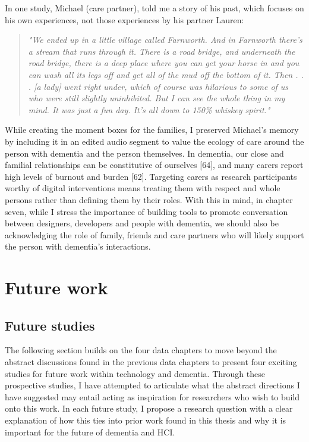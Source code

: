 In one study, Michael (care partner), told me a story of his past, which focuses on his own experiences, not those experiences by his partner Lauren:
\begin{quote}
\textit{"We ended up in a little village called Farnworth. And in Farnworth there's a stream that runs through it. There is a road bridge, and underneath the road bridge, there is a deep place where you can get your horse in and you can wash all its legs off and get all of the mud off the bottom of it. Then . . . [a lady] went right under, which of course was hilarious to some of us who were still slightly uninhibited. But I can see the whole thing in my mind. It was just a fun day. It's all down to 150\% whiskey spirit."}
\end{quote}
While creating the moment boxes for the families, I preserved Michael's memory by including it in an edited audio segment to value the ecology of care around the person with dementia and the person themselves. In dementia, our close and familial relationships can be constitutive of ourselves [64], and many carers report high levels of burnout and burden [62]. Targeting carers as research participants worthy of digital interventions means treating them with respect and whole persons rather than defining them by their roles. With this in mind, in chapter seven, while I stress the importance of building tools to promote conversation between designers, developers and people with dementia, we should also be acknowledging the role of family, friends and care partners who will likely support the person with dementia's interactions. 

\section{Future work}
\label{FutureWork}

\subsection{Future studies}
\label{FutureStudies}
The following section builds on the four data chapters to move beyond the abstract discussions found in the previous data chapters to present four exciting studies for future work within technology and dementia. Through these prospective studies, I have attempted to articulate what the abstract directions I have suggested may entail acting as inspiration for researchers who wish to build onto this work. In each future study, I propose a research question with a clear explanation of how this ties into prior work found in this thesis and why it is important for the future of dementia and HCI.

